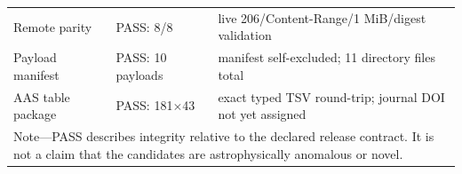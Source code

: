 \documentclass[twocolumn]{aastex701}
\begin{document}
\begin{center}
\begin{tabular}{p{}p{}p{}}
Remote parity & PASS: 8/8 & live 206/Content-Range/1 MiB/digest validation \\
Payload manifest & PASS: 10 payloads & manifest self-excluded; 11 directory files total \\
AAS table package & PASS: 181$\times$43 & exact typed TSV round-trip; journal DOI not yet assigned \\
\bottomrule
\multicolumn{3}{p{0.88\textwidth}}{\footnotesize Note---PASS describes integrity relative to the
declared release contract. It is not a claim that the candidates are astrophysically anomalous
or novel.}\\
\end{tabular}
\end{center}
\end{document}
